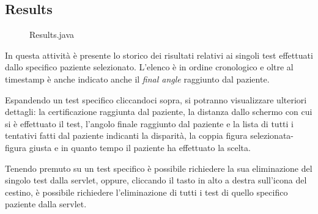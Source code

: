 \documentclass[
	corpo=12pt,
	twoside,
 	evenboxes,
	tipotesi=triennale,
    	stile=classica,
   	 greek,
]{toptesi}
\begin{document}
\subsection{Results}
\label{subsec:results}
\begin{figure}[H]
\centering
{}
\caption{Results.java}
\label{fig:app_results}
\end{figure}
In questa attività è presente lo storico dei risultati relativi ai singoli test effettuati dallo specifico paziente selezionato. L'elenco è in ordine cronologico e oltre al timestamp è anche indicato anche il \textit{final angle} raggiunto dal paziente.

Espandendo un test specifico cliccandoci sopra, si potranno visualizzare ulteriori dettagli: la certificazione raggiunta dal paziente, la distanza dallo schermo con cui si è effettuato il test, l'angolo finale raggiunto dal paziente e la lista di tutti i tentativi fatti dal paziente indicanti la disparità, la coppia figura selezionata-figura giusta e in quanto tempo il paziente ha effettuato la scelta.

Tenendo premuto su un test specifico è possibile richiedere la sua eliminazione del singolo test dalla servlet, oppure, cliccando il tasto in alto a destra sull'icona del cestino, è possibile richiedere l'eliminazione di tutti i test di quello specifico paziente dalla servlet.

\vfill
\end{document}
